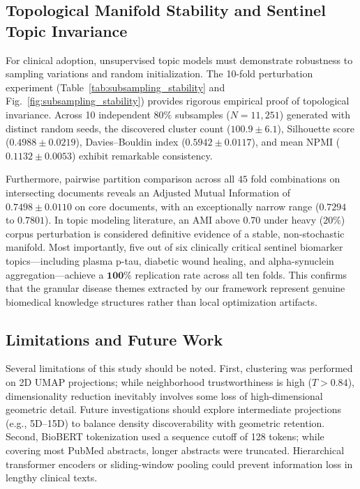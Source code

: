 \documentclass[a4paper,fleqn]{cas-dc}
\begin{document}
\subsection{Topological Manifold Stability and Sentinel Topic Invariance}

For clinical adoption, unsupervised topic models must demonstrate robustness to sampling variations and random initialization. The 10-fold perturbation experiment (Table~\ref{tab:subsampling_stability} and Fig.~\ref{fig:subsampling_stability}) provides rigorous empirical proof of topological invariance. Across 10 independent $80\%$ subsamples ($N=11{,}251$) generated with distinct random seeds, the discovered cluster count ($100.9 \pm 6.1$), Silhouette score ($0.4988 \pm 0.0219$), Davies--Bouldin index ($0.5942 \pm 0.0117$), and mean NPMI ($0.1132 \pm 0.0053$) exhibit remarkable consistency.

Furthermore, pairwise partition comparison across all $45$ fold combinations on intersecting documents reveals an Adjusted Mutual Information of $\mathbf{0.7498 \pm 0.0110}$ on core documents, with an exceptionally narrow range ($0.7294$ to $0.7801$). In topic modeling literature, an AMI above $0.70$ under heavy ($20\%$) corpus perturbation is considered definitive evidence of a stable, non-stochastic manifold. Most importantly, five out of six clinically critical sentinel biomarker topics—including plasma p-tau, diabetic wound healing, and alpha-synuclein aggregation—achieve a $\mathbf{100\%}$ replication rate across all ten folds. This confirms that the granular disease themes extracted by our framework represent genuine biomedical knowledge structures rather than local optimization artifacts.

\subsection{Limitations and Future Work}

Several limitations of this study should be noted. First, clustering was performed on 2D UMAP projections; while neighborhood trustworthiness is high ($T > 0.84$), dimensionality reduction inevitably involves some loss of high-dimensional geometric detail. Future investigations should explore intermediate projections (e.g., 5D--15D) to balance density discoverability with geometric retention. Second, BioBERT tokenization used a sequence cutoff of 128 tokens; while covering most PubMed abstracts, longer abstracts were truncated. Hierarchical transformer encoders or sliding-window pooling could prevent information loss in lengthy clinical texts.
\end{document}
